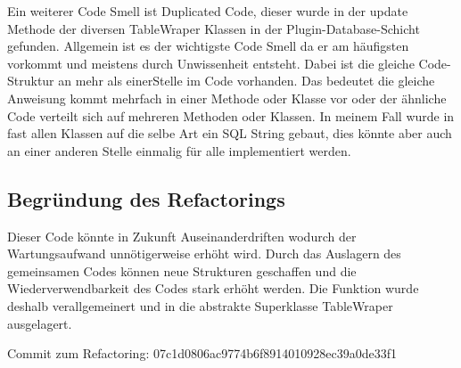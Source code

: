 Ein weiterer Code Smell ist Duplicated Code, dieser wurde in der update Methode der diversen TableWraper Klassen in der Plugin-Database-Schicht gefunden.
Allgemein ist es der wichtigste Code Smell da er am häufigsten vorkommt und meistens durch Unwissenheit entsteht.
Dabei ist die gleiche Code-Struktur an mehr als einerStelle im Code vorhanden.
Das bedeutet die gleiche Anweisung kommt mehrfach in einer Methode oder Klasse vor oder der ähnliche Code verteilt sich auf mehreren Methoden oder Klassen.
In meinem Fall wurde in fast allen Klassen auf die selbe Art ein SQL String gebaut, dies könnte aber auch an einer anderen Stelle einmalig für alle implementiert werden.

\subsection{Begründung des Refactorings}

Dieser Code könnte in Zukunft Auseinanderdriften wodurch der Wartungsaufwand unnötigerweise erhöht wird.
Durch das Auslagern des gemeinsamen Codes können neue Strukturen geschaffen und die Wiederverwendbarkeit des Codes stark erhöht werden.
Die Funktion wurde deshalb verallgemeinert und in die abstrakte Superklasse TableWraper ausgelagert.


Commit zum Refactoring: 07c1d0806ac9774b6f8914010928ec39a0de33f1


